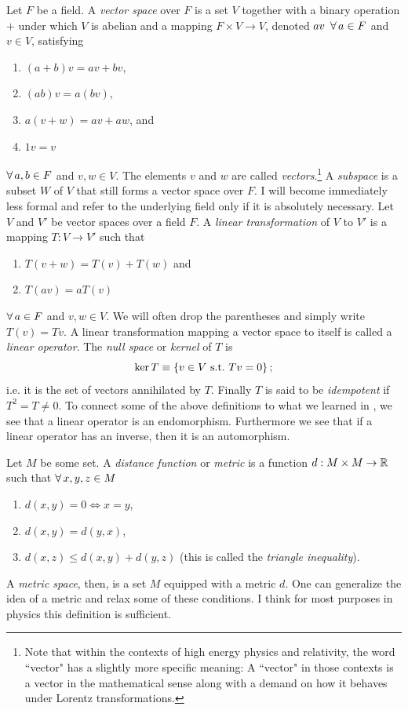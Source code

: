   Let $F$ be a field. A {\it vector space} over $F$ is a set
  $V$ together with a binary operation $+$ under which $V$ is abelian and a
  mapping $F\times V\to V$, denoted $av\ \operatorname{\forall} a\in F$ and $v\in V$,
  satisfying
  \begin{enumerate}
    \item $(a+b)v=av+bv$,
    \item $(ab)v=a(bv)$,
    \item $a(v+w)=av+aw$, and
    \item $1v=v$
  \end{enumerate}
  $\operatorname{\forall} a,b\in F$ and $v,w\in V$. The elements $v$ and $w$ are
  called {\it vectors}.\footnote{Note that within the contexts of high
  energy physics and relativity, the word ``vector" has a slightly more
  specific meaning: A ``vector" in those contexts is a vector in the
  mathematical sense along with a demand on how it behaves under
  Lorentz transformations.} A {\it subspace}
  is a subset $W$ of
  $V$ that still forms a vector space over $F$. I will become immediately
  less formal and refer to the underlying field only if it is absolutely
  necessary.
  Let $V$ and $V'$ be vector spaces over a field $F$. A
  {\it linear transformation}
  of $V$ to $V'$ is a mapping $T : V\to V'$ such that
  \begin{enumerate}
    \item $T(v+w)=T(v)+T(w)$ and
    \item $T(av)=aT(v)$
  \end{enumerate}
  $\operatorname{\forall} a\in F$ and $v,w\in V$. We will often drop the parentheses
  and simply write $T(v)=Tv$. A linear transformation mapping a
  vector space to itself is called a {\it linear operator}.
  The {\it null space} or {\it kernel} of $T$ is
  \begin{equation}
    \ker T\equiv\left\{v\in V~\text{s.t.}~ Tv=0\right\};
  \end{equation}
  i.e. it is the set of vectors annihilated by $T$. Finally $T$ is said
  to be {\it idempotent} if $T^2=T\neq0$.
To connect some of the above definitions to what we learned in
, we see that a linear operator is an endomorphism.
Furthermore we see that if a linear operator has an inverse, then it
is an automorphism.

  Let $M$ be some set. A {\it distance function} or {\it metric}
  is a function
  $d:M\times M\to \mathbb{R}$
  such that $\operatorname{\forall} x,y,z\in M$
  \begin{enumerate}
    \item $d(x,y)=0\Leftrightarrow x=y$,
    \item $d(x,y)=d(y,x)$,
    \item $d(x,z)\leq d(x,y)+d(y,z)$ (this is called the {\it triangle
          inequality}).
  \end{enumerate}
  A {\it metric space}, then, is a set $M$ equipped with a metric $d$.
One can generalize the idea of a metric and relax some of these
conditions. I think for most purposes in physics this definition is sufficient.

